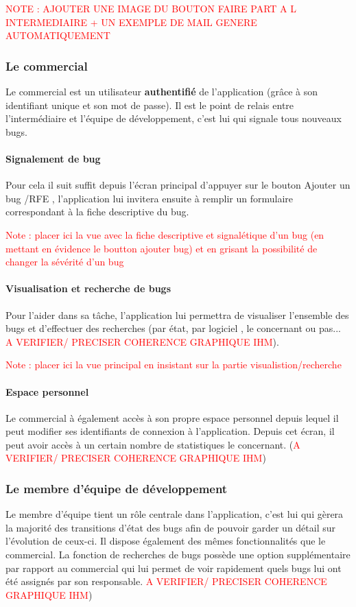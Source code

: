 \documentclass{article}[12pt]
\begin{document}
\textcolor{red}{NOTE : AJOUTER UNE IMAGE DU BOUTON FAIRE PART A L INTERMEDIAIRE + UN EXEMPLE DE MAIL GENERE AUTOMATIQUEMENT}

\subsubsection{Le commercial}
Le commercial est un utilisateur \textbf{authentifié} de l'application (grâce à son identifiant unique et son mot de passe). Il est le point de relais entre l'intermédiaire et l'équipe de développement, c'est lui qui signale tous nouveaux bugs. 

\paragraph{Signalement de bug}Pour cela il suit suffit depuis l'écran principal d'appuyer sur le bouton \og Ajouter un bug /RFE \fg, l'application lui invitera ensuite à remplir un formulaire correspondant à la fiche descriptive du bug.

\textcolor{red}{Note : placer ici la vue avec la fiche descriptive et signalétique d'un bug (en mettant en évidence le boutton ajouter bug) et en grisant la possibilité de changer la sévérité d'un bug}
\paragraph{Visualisation et recherche de bugs}
 Pour l'aider dans sa tâche, l'application lui permettra de visualiser l'ensemble des bugs et d'effectuer des recherches (par état, par logiciel , le concernant ou pas... \textcolor{red}{A VERIFIER/ PRECISER COHERENCE GRAPHIQUE IHM}). 
 
 \textcolor{red}{Note : placer ici la vue principal en insistant sur la partie visualistion/recherche}
 
 \paragraph{Espace personnel}
 Le commercial à également accès à son propre espace personnel depuis lequel il peut modifier ses identifiants de connexion à l'application. Depuis cet écran, il peut avoir accès à un certain nombre de statistiques le concernant. (\textcolor{red}{A VERIFIER/ PRECISER COHERENCE GRAPHIQUE IHM})


\subsubsection{Le membre d'équipe de développement}
Le membre d'équipe tient un rôle centrale dans l'application, c'est lui qui gèrera la majorité des transitions d'état des bugs afin de pouvoir garder un détail sur l'évolution de ceux-ci. Il dispose également des mêmes fonctionnalités que le commercial. La fonction de recherches de bugs possède une option supplémentaire par rapport au commercial qui lui permet de voir rapidement quels bugs lui ont été assignés par son responsable. \textcolor{red}{A VERIFIER/ PRECISER COHERENCE GRAPHIQUE IHM})
\end{document}
